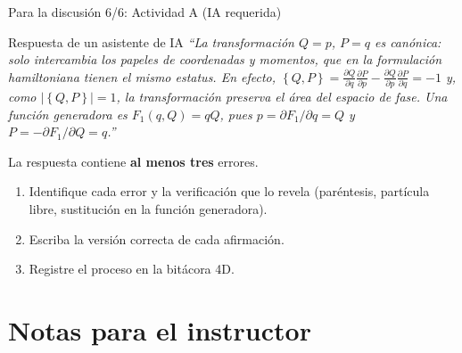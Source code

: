 \documentclass[spanish]{beamer}
\newif\ifinstructor
\newcommand{\pd}[2]{\frac{\partial #1}{\partial #2}}
\newcommand{\pb}[2]{\left\{#1,#2\right\}}    %
\begin{document}
\begin{frame}{Para la discusión 6/6: Actividad A (IA requerida)}
\begin{alertblock}{Respuesta de un asistente de IA}
\small
\textit{“La transformación $Q=p$, $P=q$ es canónica: solo intercambia los papeles de
coordenadas y momentos, que en la formulación hamiltoniana tienen el mismo estatus.
En efecto, $\pb{Q}{P}=\pd{Q}{q}\pd{P}{p}-\pd{Q}{p}\pd{P}{q}=-1$ y, como
$|\pb{Q}{P}|=1$, la transformación preserva el área del espacio de fase.
Una función generadora es $F_1(q,Q)=qQ$, pues $p=\partial F_1/\partial q=Q$ y
$P=-\partial F_1/\partial Q=q$.”}
\end{alertblock}
\pause
La respuesta contiene \textbf{al menos tres} errores.
\begin{enumerate}[<+->]
  \item Identifique cada error y la verificación que lo revela
        (paréntesis, partícula libre, sustitución en la función generadora).
  \item Escriba la versión correcta de cada afirmación.
  \item Registre el proceso en la bitácora 4D.
\end{enumerate}
\end{frame}

\ifinstructor
\appendix
\section{Notas para el instructor}
\end{document}
